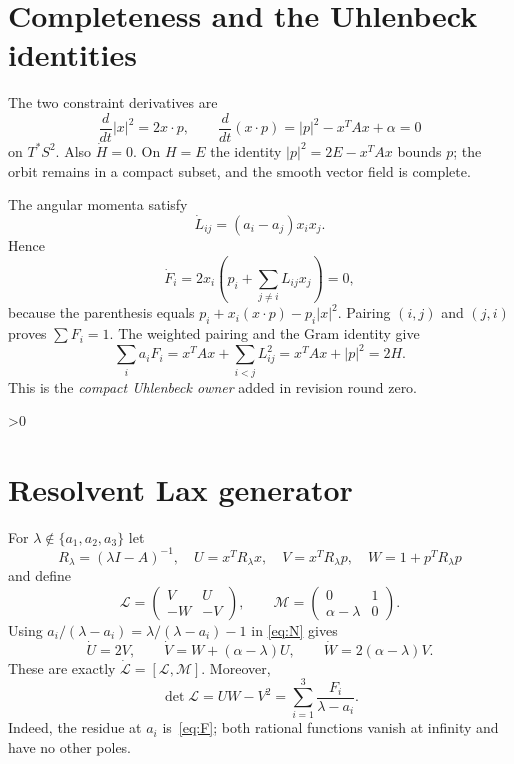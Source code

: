 \documentclass[10pt]{article}
\providecommand{\CRevisionRound}{2}
\begin{document}
\section{Completeness and the Uhlenbeck identities}
The two constraint derivatives are
\[
 \frac d{dt}|x|^2=2x\mathbin{\cdot}p,\qquad
 \frac d{dt}(x\mathbin{\cdot}p)=|p|^2-x^TAx+\alpha=0
\]
on $T^*S^2$.  Also $\dot H=0$.  On $H=E$ the identity
$|p|^2=2E-x^TAx$ bounds $p$; the orbit remains in a compact subset, and the
smooth vector field is complete.

The angular momenta satisfy
\begin{equation}\label{eq:Ldot}
 \dot L_{ij}=(a_i-a_j)x_ix_j.
\end{equation}
Hence
\[
 \dot F_i=2x_i\left(p_i+\sum_{j\ne i}L_{ij}x_j\right)=0,
\]
because the parenthesis equals
$p_i+x_i(x\mathbin{\cdot}p)-p_i|x|^2$.  Pairing $(i,j)$ and $(j,i)$ proves
$\sum F_i=1$.  The weighted pairing and the Gram identity give
\[
 \sum_i a_iF_i=x^TAx+\sum_{i<j}L_{ij}^2
 =x^TAx+|p|^2=2H.
\]
This is the \emph{compact Uhlenbeck owner} added in revision round zero.

\ifnum\CRevisionRound>0
\section{Resolvent Lax generator}\label{sec:lax}
For $\lambda\notin\{a_1,a_2,a_3\}$ let
\[
 R_\lambda=(\lambda I-A)^{-1},\quad
 U=x^TR_\lambda x,\quad V=x^TR_\lambda p,\quad
 W=1+p^TR_\lambda p
\]
and define
\begin{equation}\label{eq:lax}
 \mathcal L=\begin{pmatrix}V&U\\-W&-V\end{pmatrix},\qquad
 \mathcal M=\begin{pmatrix}0&1\\\alpha-\lambda&0\end{pmatrix}.
\end{equation}
Using $a_i/(\lambda-a_i)=\lambda/(\lambda-a_i)-1$ in
\eqref{eq:N} gives
\[
 \dot U=2V,\qquad
 \dot V=W+(\alpha-\lambda)U,
 \qquad \dot W=2(\alpha-\lambda)V.
\]
These are exactly $\dot{\mathcal L}=[\mathcal L,\mathcal M]$.  Moreover,
\begin{equation}\label{eq:residue}
 \det\mathcal L=UW-V^2
 =\sum_{i=1}^3\frac{F_i}{\lambda-a_i}.
\end{equation}
Indeed, the residue at $a_i$ is~\eqref{eq:F}; both rational functions
vanish at infinity and have no other poles.
\end{document}
